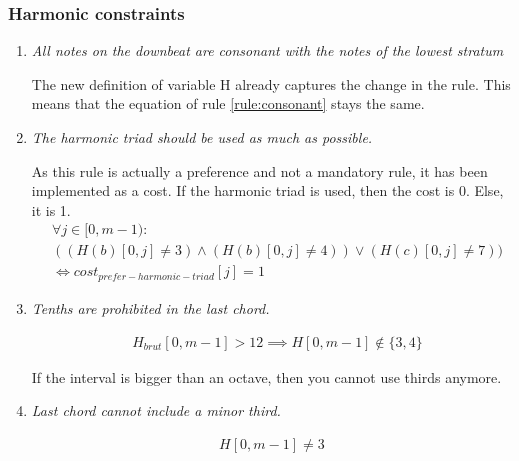 \subsubsection{Harmonic constraints}
\begin{enumerate}[wide, label=\bfseries 1.H\arabic*]        
    \item\label{constraint:consonant} \textit{All notes on the downbeat are consonant with the notes of the lowest stratum}
    
    The new definition of variable H already captures the change in the rule. This means that the equation of rule \ref{rule:consonant} stays the same.

   \setcounter{enumi}{7} 

    \item\label{constraint:harmonic-triad} \reddot \textit{The harmonic triad should be used as much as possible.}
    
    As this rule is actually a preference and not a mandatory rule, it has been implemented as a cost. If the harmonic triad is used, then the cost is 0. Else, it is 1.
    \begin{equation}
    \begin{aligned}
    &\forall j \in [0, m-1) \colon \\
    &((H(b)[0, j] \neq 3) \land (H(b)[0, j] \neq 4)) \lor (H(c)[0, j]  \neq 7)) \\
    &\iff cost_{prefer-harmonic-triad}[j] = 1
    \end{aligned}
    \end{equation}
    
    \addtocounter{enumi}{1} 


    \item\label{constraint:tenth-is-last-chord} \reddot \textit{Tenths are prohibited in the last chord.}

    \begin{equation} \begin{aligned}
    &H_{brut}[0, m-1] > 12 \implies H[0, m-1] \notin \{3, 4\}
    \end{aligned} \end{equation}

    If the interval is bigger than an octave, then you cannot use thirds anymore.

    \addtocounter{enumi}{1} 

    \item\label{constraint:minor-third} \reddot \textit{Last chord cannot include a minor third.}

    \begin{equation} \begin{aligned}
    H[0, m-1] \neq 3
    \end{aligned} \end{equation}
\end{enumerate}

